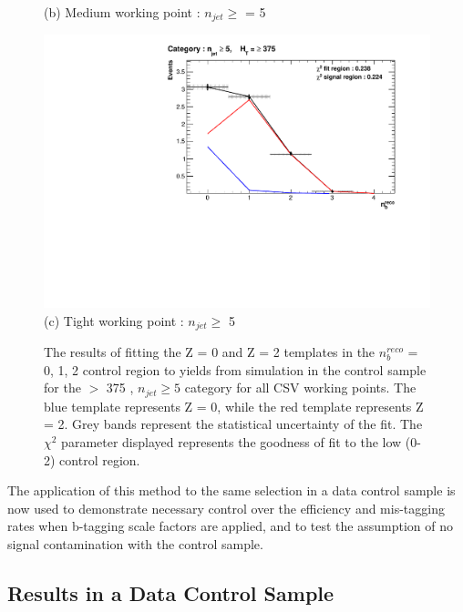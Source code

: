 \begin{figure}[ht]
\begin{minipage}[b]{0.51\linewidth}
\centering (b) Medium working point : $n_{jet} \geq$ = 5 
\end{minipage}
\footnotesize
\centering
\begin{minipage}[b]{0.51\linewidth}
\centering
\includegraphics[width = 1.0\linewidth]{plots/ThesisPlots/Final_Fit_To_MC_Normal_Tight_HTBin_OneMuon_Template_375_jet_mult_5.pdf}
\centering (c) Tight working point : $n_{jet} \geq$ 5 
\end{minipage}
\caption[The results of fitting the Z = 0 and Z = 2 templates in the $n_{b}^{reco}$ = 0, 1, 2 control region to yields from simulation in the \mupjets control sample for the \theht $>$ 375 \GeV, $n_{jet} \geq 5$ category for all \ac{CSV} working points.]{The results of fitting the Z = 0 and Z = 2 templates in the $n_{b}^{reco}$ = 0, 1, 2 control region to yields from simulation in the \mupjets control sample for the \theht $>$ 375 \GeV, $n_{jet} \geq 5$ category  for all \ac{CSV} working points. The blue template represents Z = 0, while the red template represents Z = 2. Grey bands represent the statistical uncertainty of the fit. The $\chi^{2}$ parameter displayed represents the goodness of fit to the low \nbreco (0-2) control region.}
\label{fig:template_closure_njet5}
\end{figure}
\FloatBarrier
The application of this method to the same selection in a data control sample is now used to demonstrate necessary control over the efficiency and mis-tagging rates when b-tagging scale factors are applied, and to test the assumption of no signal contamination with the \mupjets control sample.

\subsection{Results in a Data Control Sample}
\label{subsec:templatedataresults}

